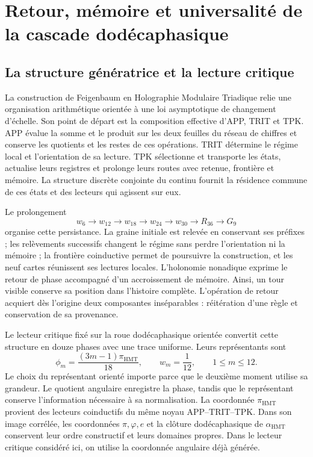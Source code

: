 \section{Retour, mémoire et universalité de la cascade dodécaphasique}
\label{sec:hmt-feig-interpretacion}

\subsection{La structure génératrice et la lecture critique}

La construction de Feigenbaum en Holographie Modulaire Triadique relie une
organisation arithmétique orientée à une loi asymptotique de changement d’échelle.
Son point de départ est la composition effective d’APP, TRIT et TPK. APP évalue
la somme et le produit sur les deux feuilles du réseau de chiffres et conserve les
quotients et les restes de ces opérations. TRIT détermine le régime local et
l’orientation de sa lecture. TPK sélectionne et transporte les états,
actualise leurs registres et prolonge leurs routes avec retenue, frontière et mémoire.
La structure discrète conjointe du continu fournit la résidence commune
de ces états et des lecteurs qui agissent sur eux.

Le prolongement
\[
w_6\longrightarrow w_{12}\longrightarrow w_{18}
\longrightarrow w_{24}\longrightarrow w_{30}
\longrightarrow R_{36}\longrightarrow G_9
\]
organise cette persistance. La graine initiale est relevée en conservant ses
préfixes ; les relèvements successifs changent le régime sans perdre l’orientation
ni la mémoire ; la frontière coinductive permet de poursuivre la construction, et les
neuf cartes réunissent ses lectures locales. L’holonomie nonadique exprime le
retour de phase accompagné d’un accroissement de mémoire. Ainsi, un tour
visible conserve sa position dans l’histoire complète. L’opération de retour
acquiert dès l’origine deux composantes inséparables :
réitération d’une règle et conservation de sa provenance.

Le lecteur critique fixé sur la roue dodécaphasique orientée convertit cette
structure en douze phases avec une trace uniforme. Leurs représentants sont
\[
\phi_m=\frac{(3m-1)\pi_{\mathrm{HMT}}}{18},
\qquad w_m=\frac1{12},\qquad 1\le m\le12.
\]
Le choix du représentant orienté importe parce que le deuxième moment
utilise sa grandeur. Le quotient angulaire enregistre la phase, tandis que le
représentant conserve l’information nécessaire à sa normalisation. La
coordonnée \(\pi_{\mathrm{HMT}}\) provient des lecteurs coinductifs du même
noyau APP--TRIT--TPK. Dans son image corrélée, les coordonnées
\(\pi,\varphi,e\) et la clôture dodécaphasique de \(\alpha_{\mathrm{HMT}}\)
conservent leur ordre constructif et leurs domaines propres. Dans le lecteur critique
considéré ici, on utilise la coordonnée angulaire déjà générée.

